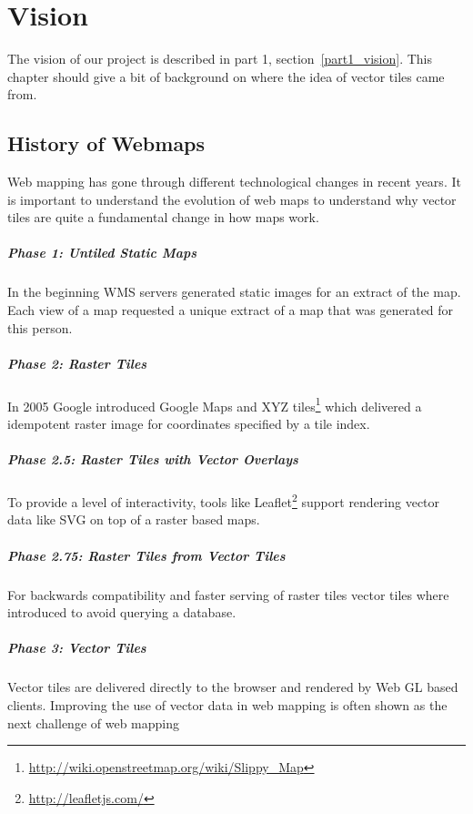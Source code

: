 \chapter{Vision}\label{vision}

The vision of our project is described in part 1, section~\ref{part1_vision}. This chapter should give a bit of background on where the idea of vector tiles came from.

\section{History of Webmaps}
\label{history-of-webmaps}

Web mapping has gone through different technological changes in recent years. It is important to understand the evolution of web maps to understand why vector tiles are quite a fundamental change in how maps work.

\paragraph{Phase 1: Untiled Static
Maps}

In the beginning WMS servers generated static images for an extract
of the map. Each view of a map requested a unique extract of a map that was generated for this person.

\paragraph{Phase 2: Raster Tiles}

In 2005 Google introduced Google Maps and XYZ 
tiles\footnote{\url{http://wiki.openstreetmap.org/wiki/Slippy_Map}}
which delivered a idempotent raster image for coordinates specified by a
tile index.

\paragraph{Phase 2.5: Raster Tiles with Vector
Overlays}

To provide a level of interactivity, tools like
Leaflet\footnote{\url{http://leafletjs.com/}} support rendering vector
data like SVG on top of a raster based maps.

\paragraph{Phase 2.75: Raster Tiles from Vector
Tiles}

For backwards compatibility and faster serving of raster tiles vector
tiles where introduced to avoid querying a database.

\paragraph{Phase 3: Vector Tiles}

Vector tiles are delivered directly to the browser and rendered by Web
GL based clients.
\newline{}
Improving the use of vector data in web mapping is often shown as the next challenge
of web mapping \cite[p.~88]{gaffuri2012toward} 
